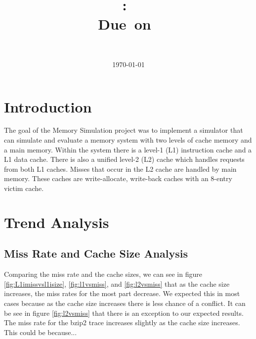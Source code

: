 \documentclass{article}
\title{
\vspace{2in}
\textmd{\textbf{\hmwkClass:\ \hmwkTitle}}\\
\normalsize\vspace{0.1in}\small{Due\ on\ \hmwkDueDate}\\
\vspace{3in}
}
\author{
\textbf{\hmwkAuthorName} \\
\hmwkAuthorNumber
}
\date{\today} %
\begin{document}
\maketitle



\newpage


\section{Introduction}

The goal of the Memory Simulation project was to implement a simulator that can simulate and evaluate a memory system with two levels of cache memory and a main memory. Within the system there is a level-1 (L1) instruction cache and a L1 data cache. There is also a unified level-2 (L2) cache which handles requests from both L1 caches. Misses that occur in the L2 cache are handled by main memory. These caches are write-allocate, write-back caches with an 8-entry victim cache. 

\section{Trend Analysis}

\subsection{Miss Rate and Cache Size Analysis}

Comparing the miss rate and the cache sizes, we can see in figure \ref{fig:L1imissvsl1isize}, \ref{fig:l1vsmiss}, and \ref{fig:l2vsmiss} that as the cache size increases, the miss rates for the most part decrease. We expected this in most cases because as the cache size increases there is less chance of a conflict. It can be see in figure \ref{fig:l2vsmiss} that there is an exception to our expected results. The miss rate for the bzip2 trace increases slightly as the cache size increases. This could be because...
\end{document}
